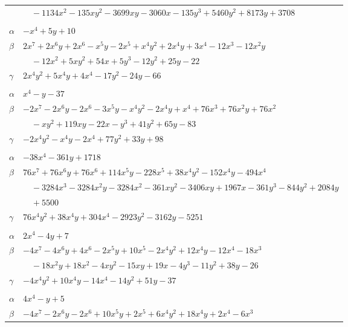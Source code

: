 \documentclass[11pt]{article}
\begin{document}
\begin{longtable}{@{}ll@{}}
 & $\quad -1134x^{2}-135xy^{2}-3699xy-3060x-135y^{3}+5460y^{2}+8173y+3708$\\
\addlinespace[3pt]
\multicolumn{2}{@{}l}{$\{i,j\}=\{9,19\}$, $k_{ij}=2\cdot 7^{2}$}\\
$\alpha$ & $-x^{4}+5y+10$\\
$\beta$ & $2x^{7}+2x^{6}y+2x^{6}-x^{5}y-2x^{5}+x^{4}y^{2}+2x^{4}y+3x^{4}-12x^{3}-12x^{2}y$\\
 & $\quad -12x^{2}+5xy^{2}+54x+5y^{3}-12y^{2}+25y-22$\\
$\gamma$ & $2x^{4}y^{2}+5x^{4}y+4x^{4}-17y^{2}-24y-66$\\
\addlinespace[3pt]
\multicolumn{2}{@{}l}{$\{i,j\}=\{9,21\}$, $k_{ij}=2^{4}\cdot 3^{2}$}\\
$\alpha$ & $x^{4}-y-37$\\
$\beta$ & $-2x^{7}-2x^{6}y-2x^{6}-3x^{5}y-x^{4}y^{2}-2x^{4}y+x^{4}+76x^{3}+76x^{2}y+76x^{2}$\\
 & $\quad -xy^{2}+119xy-22x-y^{3}+41y^{2}+65y-83$\\
$\gamma$ & $-2x^{4}y^{2}-x^{4}y-2x^{4}+77y^{2}+33y+98$\\
\addlinespace[3pt]
\multicolumn{2}{@{}l}{$\{i,j\}=\{9,26\}$, $k_{ij}=2^{6}\cdot 3\cdot 5\cdot 7$}\\
$\alpha$ & $-38x^{4}-361y+1718$\\
$\beta$ & $76x^{7}+76x^{6}y+76x^{6}+114x^{5}y-228x^{5}+38x^{4}y^{2}-152x^{4}y-494x^{4}$\\
 & $\quad -3284x^{3}-3284x^{2}y-3284x^{2}-361xy^{2}-3406xy+1967x-361y^{3}-844y^{2}+2084y$\\
 & $\quad +5500$\\
$\gamma$ & $76x^{4}y^{2}+38x^{4}y+304x^{4}-2923y^{2}-3162y-5251$\\
\addlinespace[3pt]
\multicolumn{2}{@{}l}{$\{i,j\}=\{10,15\}$, $k_{ij}=2\cdot 3^{2}$}\\
$\alpha$ & $2x^{4}-4y+7$\\
$\beta$ & $-4x^{7}-4x^{6}y+4x^{6}-2x^{5}y+10x^{5}-2x^{4}y^{2}+12x^{4}y-12x^{4}-18x^{3}$\\
 & $\quad -18x^{2}y+18x^{2}-4xy^{2}-15xy+19x-4y^{3}-11y^{2}+38y-26$\\
$\gamma$ & $-4x^{4}y^{2}+10x^{4}y-14x^{4}-14y^{2}+51y-37$\\
\addlinespace[3pt]
\multicolumn{2}{@{}l}{$\{i,j\}=\{11,18\}$, $k_{ij}=2\cdot 3$}\\
$\alpha$ & $4x^{4}-y+5$\\
$\beta$ & $-4x^{7}-2x^{6}y-2x^{6}+10x^{5}y+2x^{5}+6x^{4}y^{2}+18x^{4}y+2x^{4}-6x^{3}$\\

\end{longtable}
\end{document}
